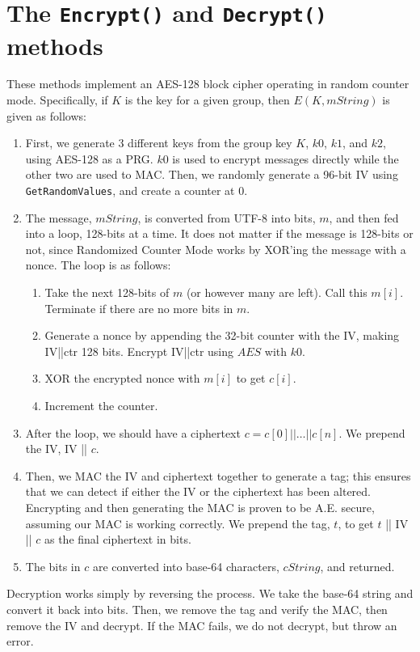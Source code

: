 \documentclass{amsart}
\begin{document}
\section{The \texttt{Encrypt()} and \texttt{Decrypt()} methods}%
These methods implement an AES-128 block cipher operating in random counter mode. Specifically, if $K$ is the key for a given group, then $E(K,mString)$ is given as follows:
\begin{enumerate}
\item First, we generate 3 different keys from the group key $K$, $k0$, $k1$, and $k2$, using AES-128 as a PRG. $k0$ is used to encrypt messages directly while the other two are used to MAC. Then, we randomly generate a 96-bit IV using \verb+GetRandomValues+, and create a counter at 0.
\item The message, $mString$, is converted from UTF-8 into bits, $m$, and then fed into a loop, 128-bits at a time. It does not matter if the message is 128-bits or not, since Randomized Counter Mode works by XOR'ing the message with a nonce. The loop is as follows:
  \begin{enumerate}
    \item Take the next 128-bits of $m$ (or however many are left). Call this $m[i]$. Terminate if there are no more bits in $m$.
    \item Generate a nonce by appending the 32-bit counter with the IV, making IV||ctr 128 bits. Encrypt IV||ctr using $AES$ with $k0$.
    \item XOR the encrypted nonce with $m[i]$ to get $c[i]$.
    \item Increment the counter.
  \end{enumerate}
\item After the loop, we should have a ciphertext $c = c[0] || \dots || c[n]$. We prepend the IV, IV || $c$.
\item Then, we MAC the IV and ciphertext together to generate a tag; this ensures that we can detect if either the IV or the ciphertext has been altered. Encrypting and then generating the MAC is proven to be A.E. secure, assuming our MAC is working correctly. We prepend the tag, $t$, to get $t$ || IV || $c$ as the final ciphertext in bits.
\item The bits in $c$ are converted into base-64 characters, $cString$, and returned.
\end{enumerate}

Decryption works simply by reversing the process. We take the base-64 string and convert it back into bits. Then, we remove the tag and verify the MAC, then remove the IV and decrypt. If the MAC fails, we do not decrypt, but throw an error.
\end{document}
